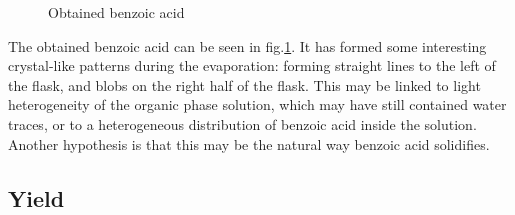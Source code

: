 \documentclass{article}
\begin{document}
\begin{figure}
    \centering
    \caption{Obtained benzoic acid}
    \label{fig:product}
\end{figure}

The obtained benzoic acid can be seen in  fig.\ref{fig:product}. It has formed some interesting crystal-like patterns during the evaporation: forming straight lines to the left of the flask, and blobs on the right half of the flask. This may be linked to light heterogeneity of the organic phase solution, which may have still contained water traces, or to a heterogeneous distribution of benzoic acid inside the solution. Another hypothesis is that this may be the natural way benzoic acid solidifies. 

\subsection{Yield}
\end{document}
